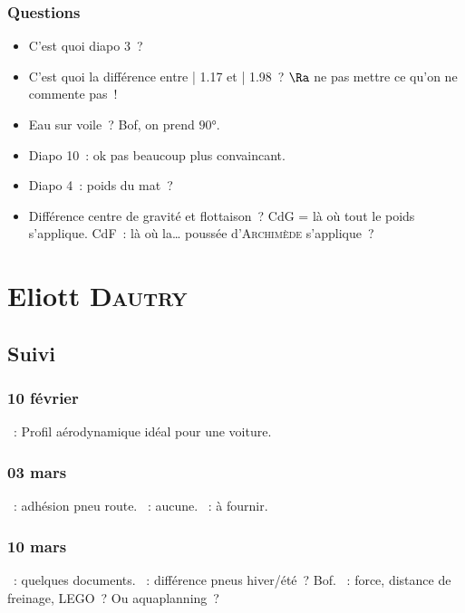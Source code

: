 \documentclass[a4paper, 11pt, final, garamond]{book}
\begin{document}
\subsection{Questions}
\begin{itemize}
  \item C'est quoi diapo 3~?
  \item C'est quoi la différence entre | \num{1.17} et | \num{1.98}~? $\Ra $ ne
    pas mettre ce qu'on ne commente pas~!
  \item Eau sur voile~? Bof, on prend $\ang{90}$.
  \item Diapo 10~: ok pas beaucoup plus convaincant.
  \item Diapo 4~: poids du mat~?
  \item Différence centre de gravité et flottaison~? CdG = là où tout le poids
    s'applique. CdF~: là où la… poussée d'\textsc{Archimède} s'applique~?
\end{itemize}

\chapter{Eliott \textsc{Dautry}}
\label{ch:eliott}
\section{Suivi}
\subsection{10 février}
\begin{itemize}
    ~: Profil aérodynamique idéal pour une voiture.
\end{itemize}

\subsection{03 mars}
\begin{itemize}
    ~: adhésion pneu route.
    ~: aucune.
    ~: à fournir.
\end{itemize}

\subsection{10 mars}
\begin{itemize}
    ~: quelques documents.
    ~: différence pneus hiver/été~? Bof.
    ~: force, distance de freinage, LEGO~? Ou aquaplanning~?
\end{itemize}
\end{document}
